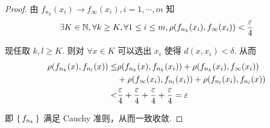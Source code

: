 \begin{proof}
    由 $f_{n_k}(x_i)\to f_\infty(x_i),i=1,\cdots,m$ 知
$$
\exists K\in\mathbb{N},\forall k\ge K,\forall 1\le i\le m,\rho(f_{n_k}(x_i),f_\infty(x_i))<\frac{\varepsilon}{4}
$$

    现任取 $k,l\ge K$. 则对 $\forall x\in K$ 可以选出 $x_i$ 使得 $d(x,x_i)<\delta$. 从而
$$
\begin{aligned}
    \rho(f_{n_k}(x),f_{n_l}(x))\le&\rho(f_{n_k}(x),f_{n_k}(x_i))+\rho(f_{n_k}(x_i),f_\infty(x_i))\\
    &+\rho(f_\infty(x_i),f_{n_l}(x_i))+\rho(f_{n_l}(x_i),f_{n_l}(x))\\
    <&\frac{\varepsilon}{4}+\frac{\varepsilon}{4}+\frac{\varepsilon}{4}+\frac{\varepsilon}{4}=\varepsilon
\end{aligned}
$$

    即 $\set{f_{n_k}}$ 满足 Cauchy 准则，从而一致收敛.
\end{proof}
